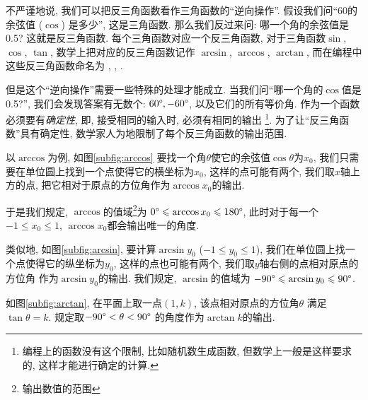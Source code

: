 不严谨地说, 我们可以把反三角函数看作三角函数的``逆向操作''.
假设我们问``60\degree 的余弦值 ($\cos$) 是多少'', 这是三角函数.
那么我们反过来问: 哪一个角的余弦值是0.5? 这就是反三角函数.
每个三角函数对应一个反三角函数,
对于三角函数$\sin$, $\cos$, $\tan$,
数学上把对应的反三角函数记作
$\arcsin$, $\arccos$, $\arctan$,
而在编程中这些反三角函数命名为
, , .

但是这个``逆向操作''需要一些特殊的处理才能成立.
当我们问``哪一个角的$\cos$值是0.5?'',
我们会发现答案有无数个:
$60\degree, -60\degree$, 以及它们的所有等价角.
作为一个函数必须要有\emph{确定性},
即, 接受相同的输入时, 必须有相同的输出
\footnote{
  编程上的函数没有这个限制, 比如随机数生成函数,
  但数学上一般是这样要求的, 这样才能进行确定的计算.
}.
为了让``反三角函数''具有确定性,
数学家人为地限制了每个反三角函数的输出范围.

以$\arccos$为例, 如图\ref{subfig:arccos}
要找一个角$\theta$使它的余弦值$\cos\theta$为$x_0$,
我们只需要在单位圆上找到一个点使得它的横坐标为$x_0$,
这样的点可能有两个, 我们取$x$轴上方的点,
把它相对于原点的方位角作为$\arccos x_0$的输出.

于是我们规定, $\arccos$的值域\footnote{输出数值的范围}为
$0\degree \leqslant \arccos x_0 \leqslant 180\degree$,
此时对于每一个$-1 \le x_0 \le 1$,
$\arccos x_0$都会输出唯一的角度.

类似地, 如图\ref{subfig:arcsin},
要计算$\arcsin{y_0}$ ($-1 \le y_0 \le 1$),
我们在单位圆上找一个点使得它的纵坐标为$y_0$,
这样的点也可能有两个, 我们取$y$轴右侧的点相对原点的方位角
作为$\arcsin{y_0}$的输出.
我们规定, $\arcsin$的值域为
$-90\degree \leqslant \arcsin{y_0} \leqslant 90\degree$.

如图\ref{subfig:arctan},
在平面上取一点$(1,k)$, 该点相对原点的方位角$\theta$
满足$\tan\theta = k$.
规定取$-90\degree < \theta < 90\degree$
的角度作为$\arctan{k}$的输出.

